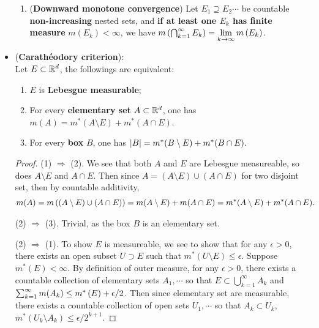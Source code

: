 \documentclass[11pt]{article}
\begin{document}
\begin{itemize}
\begin{proposition}
\begin{enumerate}
\item (\textbf{Downward monotone convergence}) Let $E_{1}\supseteq E_{2} \cdots $ be countable \textbf{non-increasing} nested sets, and \textbf{if at least one $E_{k}$ has finite measure} $m(E_{k})<\infty$, we have $m\left(\bigcap_{k=1}^{\infty}E_{k}\right) = \lim\limits_{k\rightarrow \infty}m\left(E_{k}\right)$.\\
\end{enumerate}
\end{proposition}

\item \begin{proposition} (\textbf{Carath\'{e}odory criterion}):   \citep{tao2011introduction}\\
Let $E\subset {\mathbb R}^{d}$, the followings are equivalent:
\begin{enumerate}
\item $E$ is \textbf{Lebesgue measurable};
\item For every \textbf{elementary set} $A\subset {\mathbb R}^{d}$, one has $m(A) = m^{*}(A \setminus  E) + m^{*}(A\cap E)$.
\item For every \textbf{box} $B$, one has $\left\lvert B \right\rvert = m^{*}(B \setminus   E) + m^{*}(B\cap E).$
\end{enumerate}  
\end{proposition}
\begin{proof}
(1) $\Rightarrow$ (2). We see that both $A$ and $E$ are Lebesgue measureable, so does $A \setminus E$ and $A\cap E$. Then since $A= (A \setminus E)\cup (A\cap E)$ for two disjoint set, then by countable additivity, 
\begin{align*}
m(A) = m\left( (A \setminus E)\cup (A\cap E)\right) &= m(A \setminus E) + m(A\cap E)= m^{*}(A \setminus E) + m^{*}(A\cap E).
\end{align*}

(2) $\Rightarrow$ (3). Trivial, as the box $B$ is an elementary set. 


(2) $\Rightarrow$ (1). To show $E$ is measureable, we see to show that for any $\epsilon>0$, there exists an open subset $U\supset E$ such that $m^{*}(U \setminus E)\le \epsilon$. Suppose $m^{*}(E) <\infty $. By definition of outer measure,  for any $\epsilon>0$, there exists a countable collection of elementary sets $A_{1},\cdots$ so that $E\subset \bigcup_{k=1}^{\infty}A_{k}$ and $\sum_{k=1}^{\infty}m(A_{k}) \le m^{*}\left(E\right) + \epsilon/2$. Then since elementary set are measurable, there exists a countable collection of open sets $U_{1},\cdots$ so that $A_{k}\subset U_{k}$, $m^{*}(U_{k} \setminus A_{k})\le \epsilon/2^{k+1}$. 


\end{proof}
\end{itemize}
\end{document}

